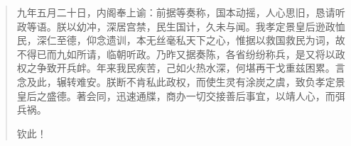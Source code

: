 \begin{quote}
	九年五月二十日，内阁奉上谕：前据等奏称，国本动摇，人心思旧，恳请听政等语。朕以幼冲，深居宫禁，民生国计，久未与闻。我孝定景皇后逊政恤民，深仁至德，仰念遗训，本无丝毫私天下之心，惟据以救国救民为词，故不得已而九如所请，临朝听政。乃昨又据奏陈，各省纷纷称兵，是又将以政权之争致开兵衅。年来我民疾苦，己如火热水深，何堪再干戈重兹困累。言念及此，辗转难安。朕断不肯私此政权，而使生灵有涂炭之虞，致负孝定景皇后之盛德。著会同，迅速通牒，商办一切交接善后事宜，以靖人心，而弭兵祸。\\

\begin{flushright}
	钦此！\\
\end{flushright}
\end{quote}
